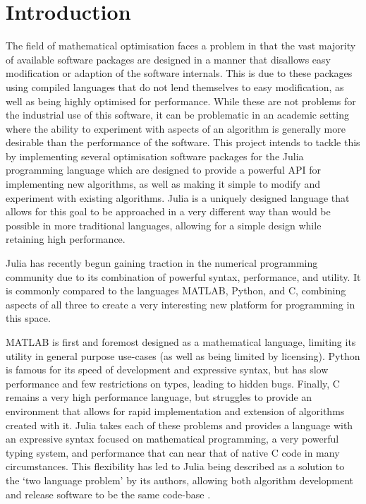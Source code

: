 \section{Introduction}
The field of mathematical optimisation faces a problem in that the vast majority of available software packages are designed in a manner that disallows easy modification or adaption of the software internals. This is due to these packages using compiled languages that do not lend themselves to easy modification, as well as being highly optimised for performance. While these are not problems for the industrial use of this software, it can be problematic in an academic setting where the ability to experiment with aspects of an algorithm is generally more desirable than the performance of the software. This project intends to tackle this by implementing several optimisation software packages for the Julia programming language which are designed to provide a powerful API for implementing new algorithms, as well as making it simple to modify and experiment with existing algorithms. Julia is a uniquely designed language that allows for this goal to be approached in a very different way than would be possible in more traditional languages, allowing for a simple design while retaining high performance. 

Julia has recently begun gaining traction in the numerical programming community due to its combination of powerful syntax, performance, and utility. It is commonly compared to the languages MATLAB, Python, and C, combining aspects of all three to create a very interesting new platform for programming in this space.

MATLAB is first and foremost designed as a mathematical language, limiting its utility in general purpose use-cases (as well as being limited by licensing). Python is famous for its speed of development and expressive syntax, but has slow performance and few restrictions on types, leading to hidden bugs. Finally, C remains a very high performance language, but struggles to provide an environment that allows for rapid implementation and extension of algorithms created with it. Julia takes each of these problems and provides a language with an expressive syntax focused on mathematical programming, a very powerful typing system, and performance that can near that of native C code in many circumstances. This flexibility has led to Julia being described as a solution to the `two language problem' by its authors, allowing both algorithm development and release software to be the same code-base \cite{TheBottomLine2018Julia:Problem}.

